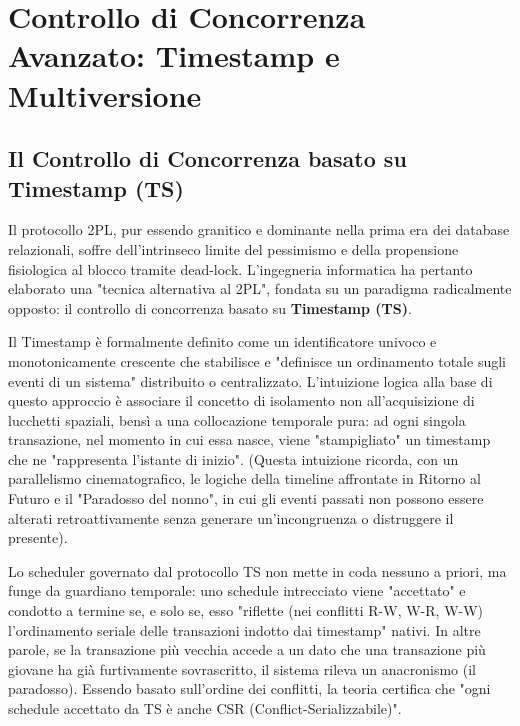 
\chapter{Controllo di Concorrenza Avanzato: Timestamp e Multiversione}

\section{Il Controllo di Concorrenza basato su Timestamp (TS)}

Il protocollo 2PL, pur essendo granitico e dominante nella prima era dei database relazionali, soffre dell'intrinseco limite del pessimismo e della propensione fisiologica al blocco tramite dead-lock. L'ingegneria informatica ha pertanto elaborato una "tecnica alternativa al 2PL", fondata su un paradigma radicalmente opposto: il controllo di concorrenza basato su \textbf{Timestamp (TS)}.

Il Timestamp è formalmente definito come un identificatore univoco e monotonicamente crescente che stabilisce e "definisce un ordinamento totale sugli eventi di un sistema" distribuito o centralizzato. L'intuizione logica alla base di questo approccio è associare il concetto di isolamento non all'acquisizione di lucchetti spaziali, bensì a una collocazione temporale pura: ad ogni singola transazione, nel momento in cui essa nasce, viene "stampigliato" un timestamp che ne "rappresenta l'istante di inizio". (Questa intuizione ricorda, con un parallelismo cinematografico, le logiche della timeline affrontate in Ritorno al Futuro e il "Paradosso del nonno", in cui gli eventi passati non possono essere alterati retroattivamente senza generare un'incongruenza o distruggere il presente).

Lo scheduler governato dal protocollo TS non mette in coda nessuno a priori, ma funge da guardiano temporale: uno schedule intrecciato viene "accettato" e condotto a termine se, e solo se, esso "riflette (nei conflitti R-W, W-R, W-W) l'ordinamento seriale delle transazioni indotto dai timestamp" nativi. In altre parole, se la transazione più vecchia accede a un dato che una transazione più giovane ha già furtivamente sovrascritto, il sistema rileva un anacronismo (il paradosso).
Essendo basato sull'ordine dei conflitti, la teoria certifica che "ogni schedule accettato da TS è anche CSR (Conflict-Serializzabile)".

